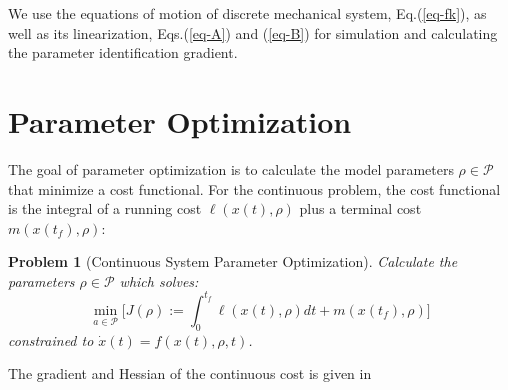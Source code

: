 \documentclass[letterpaper, 10pt, conference]{ieeeconf}
\newtheorem{problem}{Problem}
\begin{document}
We use the equations of motion of discrete mechanical system, Eq.(\ref{eq-fk}), as well as its linearization, Eqs.(\ref{eq-A}) and (\ref{eq-B}) for simulation and calculating the parameter identification gradient.  



\section{Parameter Optimization}
\label{sec-opt}
The goal of parameter optimization is to calculate the model parameters $\rho\in\mathcal{P}$ that minimize a cost functional.  For the continuous problem, the cost functional is the integral of a running cost $\ell(x(t),\rho)$ plus a terminal cost $m(x(t_f),\rho)$:
\begin{problem}[Continuous System Parameter Optimization]
Calculate the parameters $\rho\in\mathcal{P}$ which solves:
\[
\min_{a\in\mathcal{P}} \Big[J(\rho):=\int_0^{t_f}\ell(x(t),\rho)dt + m(x(t_f),\rho)\Big]
\]
constrained to $\dot{x}(t) = f(x(t),\rho,t)$.
\end{problem}
The gradient and Hessian of the continuous cost is given in \cite{miller_murphey}
\end{document}
